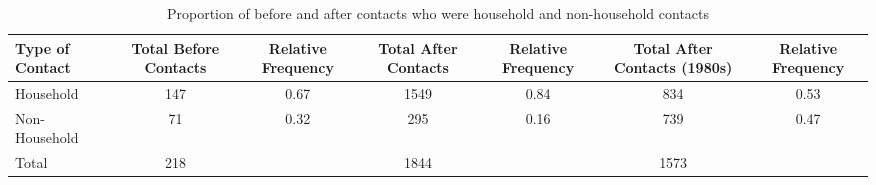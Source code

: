
\begin{table}[h]
\footnotesize
\begin{tabular}{lcccccc} 
\toprule
Type of Contact & Total Before Contacts & Relative Frequency &	Total After Contacts &	Relative Frequency & Total After Contacts (1980s) & Relative Frequency \\
\midrule
Household & 147 & 0.67 & 1549 &	0.84 & 834 & 0.53 \\
Non-Household &	71 & 0.32 &	295	& 0.16 & 739 & 0.47 \\
Total &	218	& &	1844 &	& 1573 & \\
\bottomrule
\end{tabular}
\caption{Proportion of before and after contacts who were household and non-household contacts}
\label{tab:table1}
\end{table}
